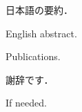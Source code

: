 \documentclass[master]{cimt}
\begin{document}
\maketitle

\frontmatter

\begin{jabstract}
  日本語の要約．
\end{jabstract}

\begin{eabstract}
  English abstract.
\end{eabstract}

\tableofcontents

\mainmatter







\backmatter

\pubUseLongName %
\begin{publications}
  \item Publications.
\end{publications}




\begin{acknowledgements}
  謝辞です．
\end{acknowledgements}

\appendix

If needed.
\end{document}
